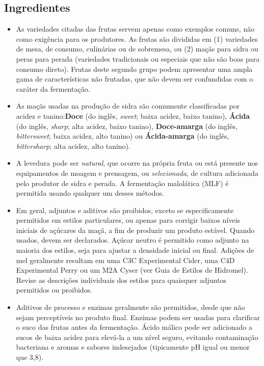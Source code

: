 \subsection*{Ingredientes}

\begin{itemize}
\item As variedades citadas das frutas servem apenas como exemplos comuns, não como exigência para os produtores. As frutas são divididas em (1) variedades de mesa, de consumo, culinárias ou de sobremesa, ou (2) maçãs para sidra ou peras para perada (variedades tradicionais ou especiais que não são boas para consumo direto). Frutas deste segundo grupo podem apresentar uma ampla gama de características não frutadas, que não devem ser confundidas com o caráter da fermentação.
\item As maçãs usadas na produção de sidra são comumente classificadas por acidez e tanino:\textbf{Doce} (do inglês, \textit{sweet}; baixa acidez, baixo tanino), \textbf{Ácida} (do inglês, \textit{sharp}; alta acidez, baixo tanino), \textbf{Doce-amarga} (do inglês, \textit{bittersweet}; baixa acidez, alto tanino) ou \textbf{Ácida-amarga} (do inglês, \textit{bittersharp}; alta acidez, alto tanino).
\item A levedura pode ser \textit{natural}, que ocorre na própria fruta ou está presente nos equipamentos de moagem e prensagem, ou \textit{selecionada}, de cultura adicionada pelo produtor de sidra e perada. A fermentação malolática (MLF) é permitida usando qualquer um desses métodos.
\item Em geral, adjuntos e aditivos são proibidos, exceto se especificamente permitidos em estilos particulares, ou apenas para corrigir baixos níveis iniciais de açúcares da maçã, a fim de produzir um produto estável. Quando usados, devem ser declarados. Açúcar neutro é permitido como adjunto na maioria dos estilos, seja para ajustar a densidade inicial ou final. Adições de mel geralmente resultam em uma C3C Experimental Cider, uma C4D Experimental Perry ou um M2A Cyser (ver Guia de Estilos de Hidromel). Revise as descrições individuais dos estilos para quaisquer adjuntos permitidos ou proibidos.
\item Aditivos de processo e enzimas geralmente são permitidos, desde que não sejam perceptíveis no produto final. Enzimas podem ser usadas para clarificar o suco das frutas antes da fermentação. Ácido málico pode ser adicionado a sucos de baixa acidez para elevá-la a um nível seguro, evitando contaminação bacteriana e aromas e sabores indesejados (tipicamente pH igual ou menor que 3,8).

\end{itemize}
